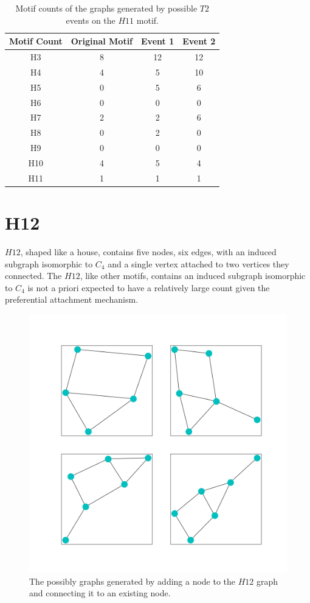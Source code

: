 \begin{table}
    \centering
    \begin{tabular}{||c c c c||} 
    \hline
    Motif Count & Original Motif & Event 1 & Event 2 \\ [0.5ex] 
    \hline\hline
    H3 & 8 & 12 & 12 \\ 
    \hline
    H4 & 4 & 5 & 10  \\
    \hline
    H5 & 0 & 5 & 6  \\
    \hline
    H6 & 0 & 0 & 0  \\
    \hline
    H7 & 2 & 2 & 6 \\
    \hline
    H8 & 0 & 2 & 0 \\
    \hline
    H9 & 0 & 0 & 0 \\
    \hline
    H10 & 4 & 5 & 4 \\
    \hline
    H11 & 1 & 1 & 1\\
    \hline
   \end{tabular}
   \caption{Motif counts of the graphs generated by possible $T2$ events on the $H11$ motif.}
   \label{table:9}
\end{table}

\FloatBarrier

\section{H12}
$H12$, shaped like a house, contains five nodes, six edges, with an induced subgraph isomorphic to $C_4$
and a single vertex attached to two vertices they connected. The $H12$, like other
motifs, contains an induced subgraph isomorphic to $C_4$ is not a priori expected to have a relatively large count
given the preferential attachment mechanism. 

\begin{figure}[!ht]
    \includegraphics[width=12cm]{Images/H12_evolution.png}
    \centering
    \caption{The possibly graphs generated by adding a node to the $H12$ graph 
    and connecting it to an existing node.}
\end{figure}

